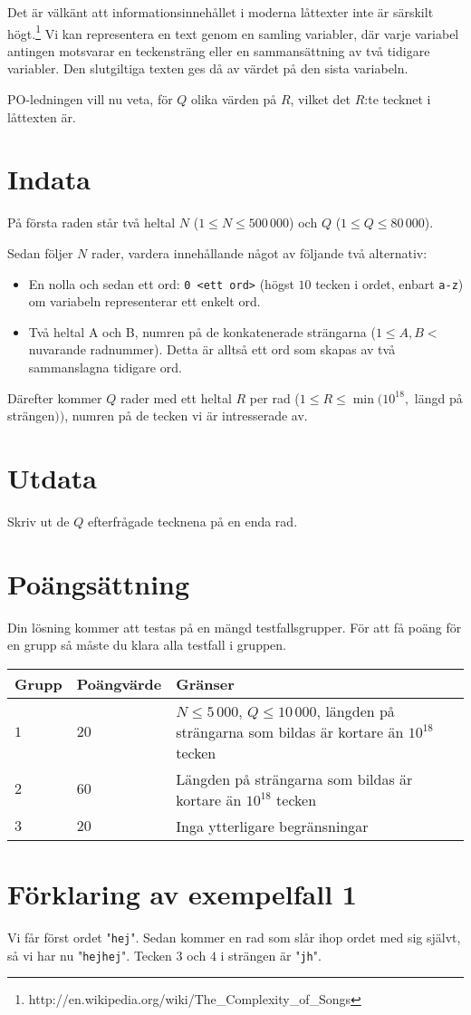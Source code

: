 Det är välkänt att informationsinnehållet i moderna låttexter inte är särskilt
högt.\footnote{http://en.wikipedia.org/wiki/The\_Complexity\_of\_Songs}
Vi kan representera en text genom en samling variabler, där varje
variabel antingen motsvarar en teckensträng eller en sammansättning av två
tidigare variabler. Den slutgiltiga texten ges då av värdet på den sista
variabeln.

PO-ledningen vill nu veta, för $Q$ olika värden på $R$, vilket det $R$:te tecknet i
låttexten är.

\section*{Indata}

På första raden står två heltal $N$ ($1 \leq N \leq 500\,000$) och $Q$ ($1 \leq Q
\leq 80\,000$).

Sedan följer $N$ rader, vardera innehållande något av följande två alternativ:

\begin{itemize}
\item En nolla och sedan ett ord: \texttt{0 <ett ord>} (högst $10$ tecken i
      ordet, enbart \texttt{a-z}) om variabeln representerar ett enkelt ord.
\item Två heltal A och B, numren på de konkatenerade strängarna
      ($1 \leq A, B < $ nuvarande radnummer). Detta är alltså ett ord som skapas
      av två sammanslagna tidigare ord.
\end{itemize}

Därefter kommer $Q$ rader med ett heltal $R$ per rad ($1 \leq R \leq \min(10^{18},$ längd på
strängen$))$, numren på de tecken vi är intresserade av.

\section*{Utdata}

Skriv ut de $Q$ efterfrågade tecknena på en enda rad.

\section*{Poängsättning}
Din lösning kommer att testas på en mängd testfallsgrupper.
För att få poäng för en grupp så måste du klara alla testfall i gruppen.

\noindent
\begin{tabular}{| l | l | l |}
  \hline
  Grupp & Poängvärde & Gränser \\ \hline
  $1$   & $20$       & $N \leq 5\,000$, $Q \leq 10\,000$, längden på strängarna som bildas är kortare än $10^{18}$ tecken \\ \hline
  $2$   & $60$       & Längden på strängarna som bildas är kortare än $10^{18}$ tecken \\ \hline
  $3$   & $20$       & Inga ytterligare begränsningar \\ \hline
\end{tabular}

\section*{Förklaring av exempelfall 1}
Vi får först ordet "\texttt{hej}". Sedan kommer en rad som slår ihop
ordet med sig självt, så vi har nu "\texttt{hejhej}". Tecken $3$ och $4$ i strängen är "\texttt{jh}".